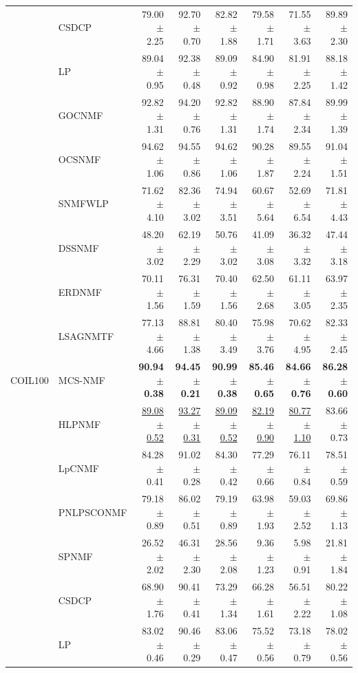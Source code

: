 \begin{landscape}
\begin{longtable}{llrrrrrr}
 & CSDCP & 79.00 $\pm$ 2.25 & 92.70 $\pm$ 0.70 & 82.82 $\pm$ 1.88 & 79.58 $\pm$ 1.71 & 71.55 $\pm$ 3.63 & 89.89 $\pm$ 2.30 \\
 & LP & 89.04 $\pm$ 0.95 & 92.38 $\pm$ 0.48 & 89.09 $\pm$ 0.92 & 84.90 $\pm$ 0.98 & 81.91 $\pm$ 2.25 & 88.18 $\pm$ 1.42 \\
 & GOCNMF & 92.82 $\pm$ 1.31 & 94.20 $\pm$ 0.76 & 92.82 $\pm$ 1.31 & 88.90 $\pm$ 1.74 & 87.84 $\pm$ 2.34 & 89.99 $\pm$ 1.39 \\
 & OCSNMF & 94.62 $\pm$ 1.06 & 94.55 $\pm$ 0.86 & 94.62 $\pm$ 1.06 & 90.28 $\pm$ 1.87 & 89.55 $\pm$ 2.24 & 91.04 $\pm$ 1.51 \\
 & SNMFWLP & 71.62 $\pm$ 4.10 & 82.36 $\pm$ 3.02 & 74.94 $\pm$ 3.51 & 60.67 $\pm$ 5.64 & 52.69 $\pm$ 6.54 & 71.81 $\pm$ 4.43 \\
 & DSSNMF & 48.20 $\pm$ 3.02 & 62.19 $\pm$ 2.29 & 50.76 $\pm$ 3.02 & 41.09 $\pm$ 3.08 & 36.32 $\pm$ 3.32 & 47.44 $\pm$ 3.18 \\
 & ERDNMF & 70.11 $\pm$ 1.56 & 76.31 $\pm$ 1.59 & 70.40 $\pm$ 1.56 & 62.50 $\pm$ 2.68 & 61.11 $\pm$ 3.05 & 63.97 $\pm$ 2.35 \\
 & LSAGNMTF & 77.13 $\pm$ 4.66 & 88.81 $\pm$ 1.38 & 80.40 $\pm$ 3.49 & 75.98 $\pm$ 3.76 & 70.62 $\pm$ 4.95 & 82.33 $\pm$ 2.45 \\
\midrule
COIL100 & MCS-NMF & \textbf{90.94 $\pm$ 0.38} & \textbf{94.45 $\pm$ 0.21} & \textbf{90.99 $\pm$ 0.38} & \textbf{85.46 $\pm$ 0.65} & \textbf{84.66 $\pm$ 0.76} & \textbf{86.28 $\pm$ 0.60} \\
 & HLPNMF & \underline{89.08 $\pm$ 0.52} & \underline{93.27 $\pm$ 0.31} & \underline{89.09 $\pm$ 0.52} & \underline{82.19 $\pm$ 0.90} & \underline{80.77 $\pm$ 1.10} & 83.66 $\pm$ 0.73 \\
 & LpCNMF & 84.28 $\pm$ 0.41 & 91.02 $\pm$ 0.28 & 84.30 $\pm$ 0.42 & 77.29 $\pm$ 0.66 & 76.11 $\pm$ 0.84 & 78.51 $\pm$ 0.59 \\
 & PNLPSCONMF & 79.18 $\pm$ 0.89 & 86.02 $\pm$ 0.51 & 79.19 $\pm$ 0.89 & 63.98 $\pm$ 1.93 & 59.03 $\pm$ 2.52 & 69.86 $\pm$ 1.13 \\
 & SPNMF & 26.52 $\pm$ 2.02 & 46.31 $\pm$ 2.30 & 28.56 $\pm$ 2.08 & 9.36 $\pm$ 1.23 & 5.98 $\pm$ 0.91 & 21.81 $\pm$ 1.84 \\
 & CSDCP & 68.90 $\pm$ 1.76 & 90.41 $\pm$ 0.41 & 73.29 $\pm$ 1.34 & 66.28 $\pm$ 1.61 & 56.51 $\pm$ 2.22 & 80.22 $\pm$ 1.08 \\
 & LP & 83.02 $\pm$ 0.46 & 90.46 $\pm$ 0.29 & 83.06 $\pm$ 0.47 & 75.52 $\pm$ 0.56 & 73.18 $\pm$ 0.79 & 78.02 $\pm$ 0.56 \\

\end{longtable}
\end{landscape}
